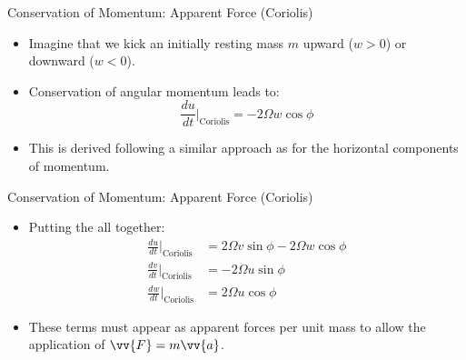 \begin{frame}{Conservation of Momentum: Apparent Force (Coriolis)}
\begin{itemize}
	\item Imagine that we kick an initially resting mass $m$ upward ($w>0$) or downward ($w<0$).
	\item Conservation of angular momentum leads to:
	$$\frac{du}{dt}|_{\text{Coriolis}} = -2\Omega w \cos \phi$$
	\item This is derived following a similar approach as for the horizontal components of momentum.
\end{itemize}
\end{frame}
\begin{frame}{Conservation of Momentum: Apparent Force (Coriolis)}
\begin{itemize}
	\item Putting the all together:
	\begin{align*}
		\frac{du}{dt}|_{\text{Coriolis}} &= 2\Omega v \sin \phi - 2\Omega w \cos \phi\\
		\frac{dv}{dt}|_{\text{Coriolis}} &= -2\Omega u \sin \phi \\
		\frac{dw}{dt}|_{\text{Coriolis}} &= 2\Omega u \cos \phi
	\end{align*}
	\item These terms must appear as apparent forces per unit mass to allow the application of $\vv{F} = m\vv{a}$.
\end{itemize}
\end{frame}


